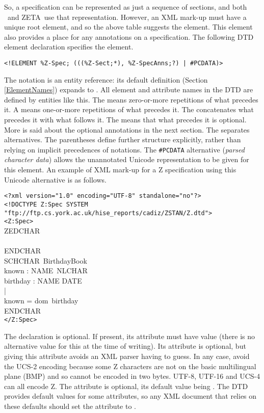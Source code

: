 \documentclass[a4paper,10pt]{article}
\def\Zeta{{\sf Z{\small E}T{\small A}}}
\begin{document}
So, a specification can be represented as just a sequence of sections,
and both \CADiZ\ and \Zeta\ use that representation.
However, an XML mark-up must have a unique root element,
and so the above table suggests the  element.
This element also provides a place for any annotations on a specification.
The following DTD element declaration specifies the  element.
\begin{verbatim}
<!ELEMENT %Z-Spec; (((%Z-Sect;*), %Z-SpecAnns;?) | #PCDATA)>
\end{verbatim}
The notation  is an entity reference:
its default definition (Section \ref{ElementNames}) expands to .
All element and attribute names in the DTD are defined by entities like this.
The \AFont{*} means zero-or-more repetitions of what precedes it.
A \AFont{+} means one-or-more repetitions of what precedes it.
The \AFont{,} concatenates what precedes it with what follows it.
The  means that what precedes it is optional.
More is said about the optional annotations in the next section.
The \AFont{|} separates alternatives.
The parentheses define further structure explicitly,
rather than relying on implicit precedences of notations.
The \verb!#PCDATA! alternative (\textit{parsed character data})
allows the unannotated Unicode representation to be given for this element.
An example of XML mark-up for a Z specification using this Unicode alternative
is as follows.
\begin{zed}
\verb#<?xml version="1.0" encoding="UTF-8" standalone="no"?>#\\
\verb#<!DOCTYPE Z:Spec SYSTEM "ftp://ftp.cs.york.ac.uk/hise_reports/cadiz/ZSTAN/Z.dtd">#\\
\verb#<Z:Spec>#\\
ZEDCHAR\\
[NAME, DATE]\\
ENDCHAR\\
SCHCHAR~BirthdayBook\\
known : \power NAME~NLCHAR\\
birthday : NAME \pfun DATE\\
|\\
known = dom~birthday\\
ENDCHAR\\
\verb#</Z:Spec>#
\end{zed}

The  declaration is optional.
If present,
its  attribute must have value 
(there is no alternative value for this at the time of writing).
Its  attribute is optional,
but giving this attribute avoids an XML parser having to guess.
In any case, avoid the UCS-2 encoding because some Z characters
are not on the basic multilingual plane (BMP)
and so cannot be encoded in two bytes.
UTF-8, UTF-16 and UCS-4 can all encode Z.
The  attribute is optional,
its default value being . 
The DTD provides default values for some attributes,
so any XML document that relies on these defaults
should set the  attribute to .
\end{document}
